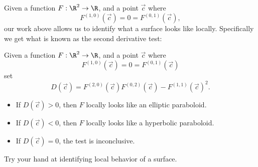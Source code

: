 \documentclass{ximera}
\begin{document}
Given a function $F:\R^2\to \R$, and a point $\vec{c}$ where
\[
F^{(1,0)}(\vec{c}) = 0 = F^{(0,1)}(\vec{c}),
\]
our work above allows us to identify what a surface looks like
locally. Specifically we get what is known as the second derivative test:

\begin{theorem}
  Given a function $F:\R^2\to \R$, and a point $\vec{c}$ where
  \[
  F^{(1,0)}(\vec{c}) = 0 = F^{(0,1)}(\vec{c}) 
  \]
  set
  \[
  D(\vec{c}) = F^{(2,0)}(\vec{c})F^{(0,2)}(\vec{c})-F^{(1,1)}(\vec{c})^2.
  \]
  \begin{itemize}
  \item If $D(\vec{c})>0$, then $F$ locally looks like an elliptic paraboloid.
  \item	If $D(\vec{c})<0$, then $F$ locally looks like a hyperbolic paraboloid.
  \item If $D(\vec{c})=0$, the test is inconclusive.
  \end{itemize}
\end{theorem}

Try your hand at identifying local behavior of a surface.
\end{document}
